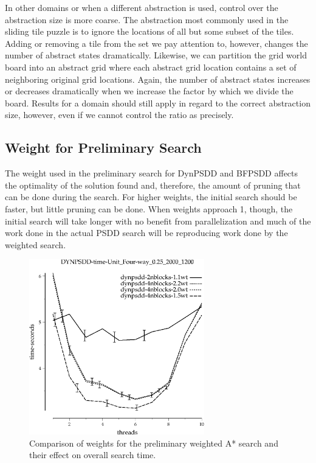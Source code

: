 \documentclass{article}
\begin{document}

In other domains or when a different abstraction is used, control over the abstraction size is more coarse. The abstraction most commonly used in the sliding tile puzzle is to ignore the locations of all but some subset of the tiles. Adding or removing a tile from the set we pay attention to, however, changes the number of abstract states dramatically. Likewise, we can partition the grid world board into an abstract grid where each abstract grid location contains a set of neighboring original grid locations. Again, the number of abstract states increases or decreases dramatically when we increase the factor by which we divide the board. Results for a domain should still apply in regard to the correct abstraction size, however, even if we cannot control the ratio as precisely.
\subsection{Weight for Preliminary Search}
The weight used in the preliminary search for DynPSDD and BFPSDD affects the optimality of the solution found and, therefore, the amount of pruning that can be done during the search. For higher weights, the initial search should be faster, but little pruning can be done. When weights approach 1, though, the initial search will take longer with no benefit from parallelization and much of the work done in the actual PSDD search will be reproducing work done by the weighted search.

\begin{figure}[h!]
\includegraphics[width=3in]{../graphs/grid_unit_four-way_0.25_2000_1200/DYNPSDD-time-Unit_Four-way_0.25_2000_1200.eps}
\caption{Comparison of weights for the preliminary weighted A* search and their effect on overall search time.}
\label{fig:DynPSDD-weight-grid}
\end{figure}
\end{document}
